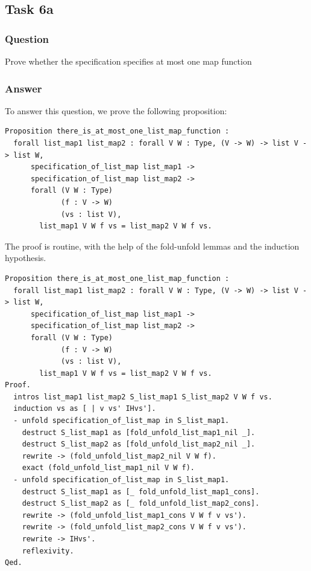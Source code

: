 \documentclass{article}
\begin{document}
\subsection{Task 6a}

\subsubsection{Question}
Prove whether the specification specifies at most one map function

\subsubsection{Answer}

To answer this question, we prove the following proposition:

\begin{lstlisting}
Proposition there_is_at_most_one_list_map_function :
  forall list_map1 list_map2 : forall V W : Type, (V -> W) -> list V -> list W,
      specification_of_list_map list_map1 ->
      specification_of_list_map list_map2 ->
      forall (V W : Type)
             (f : V -> W)
             (vs : list V),
        list_map1 V W f vs = list_map2 V W f vs.
\end{lstlisting}

The proof is routine, with the help of the fold-unfold lemmas and the induction hypothesis.

\begin{lstlisting}
Proposition there_is_at_most_one_list_map_function :
  forall list_map1 list_map2 : forall V W : Type, (V -> W) -> list V -> list W,
      specification_of_list_map list_map1 ->
      specification_of_list_map list_map2 ->
      forall (V W : Type)
             (f : V -> W)
             (vs : list V),
        list_map1 V W f vs = list_map2 V W f vs.
Proof.
  intros list_map1 list_map2 S_list_map1 S_list_map2 V W f vs.
  induction vs as [ | v vs' IHvs'].
  - unfold specification_of_list_map in S_list_map1.
    destruct S_list_map1 as [fold_unfold_list_map1_nil _].
    destruct S_list_map2 as [fold_unfold_list_map2_nil _].
    rewrite -> (fold_unfold_list_map2_nil V W f).
    exact (fold_unfold_list_map1_nil V W f).
  - unfold specification_of_list_map in S_list_map1.
    destruct S_list_map1 as [_ fold_unfold_list_map1_cons].
    destruct S_list_map2 as [_ fold_unfold_list_map2_cons].
    rewrite -> (fold_unfold_list_map1_cons V W f v vs').
    rewrite -> (fold_unfold_list_map2_cons V W f v vs').
    rewrite -> IHvs'.
    reflexivity.
Qed.
\end{lstlisting}
\end{document}
